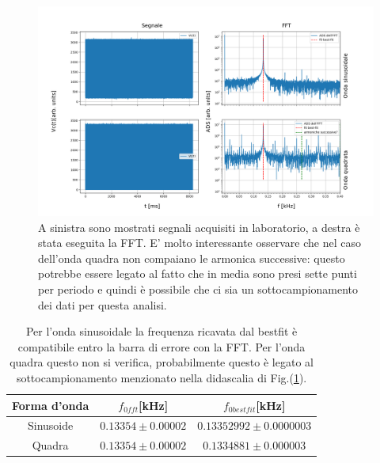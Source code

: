 \documentclass{article}
\begin{document}
         \begin{figure}[H]
            \centering
            \includegraphics[scale=0.45]{FFT5/FFTwaveforms3.png}
            \caption{A sinistra sono mostrati segnali acquisiti in laboratorio, a destra 
                    è stata eseguita la FFT.
                    E' molto interessante osservare che nel caso dell'onda quadra 
                    non compaiano le armonica successive: questo potrebbe essere 
                    legato al fatto che in media sono presi sette punti per periodo e quindi 
                    è possibile che ci sia un sottocampionamento dei dati per questa analisi.}
            \label{fig:for_lun}
        \end{figure}    


         \begin{table}[H]
            \centering
                \begin{tabular}{ccc}
                    Forma d'onda    &   $f_{0fft}$[kHz]                     & $f_{0bestfit}$[kHz] \\
                    \hline
                    Sinusoide       &   $0.13354 \pm 0.00002$           & $0.13352992 \pm 0.0000003$ \\
                    Quadra          &   $0.13354 \pm 0.00002$           & $0.1334881 \pm  0.000003$ \\
                \end{tabular}
                \caption{Per l'onda sinusoidale la frequenza ricavata dal bestfit è compatibile
                entro la barra di errore con la FFT. Per l'onda quadra questo non si verifica, 
                probabilmente questo è legato al sottocampionamento menzionato nella didascalia 
                di Fig.(\ref{fig:for_lun}).}
                \label{tab:for_lun}
        \end{table}
        
\end{document}
